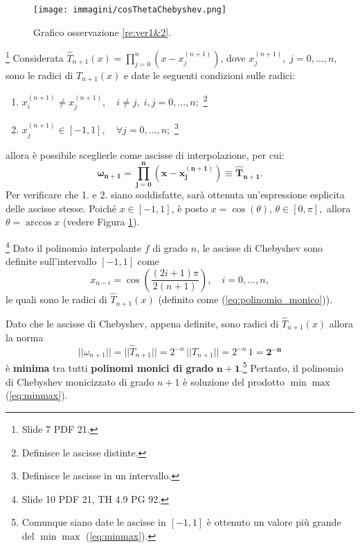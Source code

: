 \begin{figure}
    \centering
    \texttt{[image: immagini/cosThetaChebyshev.png]}
    \caption{Grafico osservazione \ref{re:ver1&2}.}\label{fig:cosThetaChebyshev}
\end{figure}

\begin{remark}\label{re:ver1&2}\footnote{Slide 7 PDF 21.}
	Considerata $\widehat T_{n+1}(x)=\prod_{j=0}^n\left(x-x_j^{(n+1)}\right)$, dove $x_j^{(n+1)},\; j=0,\hdots,n$, sono le radici di $T_{n+1}(x)$ e date le seguenti condizioni sulle radici:
	\begin{enumerate}
		\item $x_i^{(n+1)}\neq x_j^{(n+1)},\quad i\neq j,\; i,j=0,\hdots,n;$ \footnote{Definisce le ascisse distinte.}
		\item $x_j^{(n+1)}\in [-1,1],\quad \forall j=0,\hdots,n;$ \footnote{Definisce le ascisse in un intervallo.}
	\end{enumerate}
	allora è possibile sceglierle come ascisse di interpolazione, per cui:
	\begin{equation*}
		\boldsymbol{\omega_{n+1}=\prod_{j=0}^{n}\left(x-x_j^{(n+1)}\right)\equiv\widehat T_{n+1}}.
	\end{equation*}
	Per verificare che 1. e 2. siano soddisfatte, sarà ottenuta un'espressione esplicita delle ascisse stesse. Poiché $x\in [-1,1]$, è posto $x=\cos(\theta),\, \theta\in [0,\pi],$ allora $\theta=\arccos{x}$ (vedere Figura \ref{fig:cosThetaChebyshev}).
\end{remark}

\begin{definition}\footnote{Slide 10 PDF 21, TH 4.9 PG 92.}
    Dato il polinomio interpolante $f$ di grado $n$, le ascisse di Chebyshev sono definite sull'intervallo $[-1, 1]$ come
    \begin{equation}\label{eq:ascisseChebyshev}
        x_{n-i}=\cos{\left(\frac{(2i+1)\pi}{2(n+1)}\right)},\quad i=0,\hdots,n,
    \end{equation}
    le quali sono le radici di $\widehat T_{n+1}(x)$ (definito come (\ref{eq:polinomio_monico})).
\end{definition}

Dato che le ascisse di Chebyshev, appena definite, sono radici di $\widehat T_{n+1}(x)$ allora la norma
\begin{equation*}
    ||\omega_{n+1}||=||\widehat T_{n+1}||=2^{-n}\,||T_{n+1}||=2^{-n}\, 1 = \boldsymbol{2^{-n}}
\end{equation*}
è \textbf{minima} tra tutti \textbf{polinomi monici di grado} $\boldsymbol{n+1}$.\footnote{Comunque siano date le ascisse in $[-1,1]$ è ottenuto un valore più grande del $\min\max$ (\ref{eq:minmax}).} Pertanto, il polinomio di Chebyshev monicizzato di grado $n+1$ è soluzione del prodotto $\min\max$ (\ref{eq:minmax}). 

